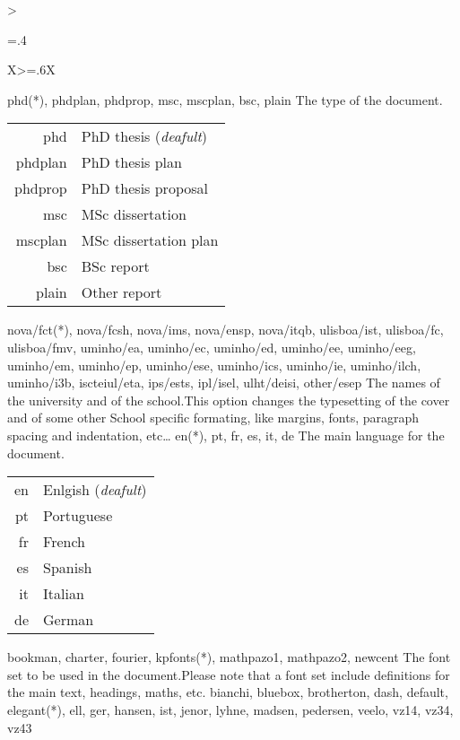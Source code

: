 \begin{xltabular}{\linewidth}{>{\hsize=.4\hsize\raggedright\arraybackslash}X>{\hsize=.6\hsize}X}
  \toprule
  {phd(*), phdplan, phdprop, msc, mscplan, bsc, plain}%
  {The type of the document.}{
    \begin{tabular}{r@{ $\rightarrow$ }X}
      phd     & PhD thesis (\emph{deafult}) \\
      phdplan & PhD thesis plan             \\
      phdprop & PhD thesis proposal         \\
      msc     & MSc dissertation            \\
      mscplan & MSc dissertation plan       \\
      bsc     & BSc report                  \\
      plain   & Other report                \\
    \end{tabular}
  }
  \midrule
  {nova/fct(*), nova/fcsh, nova/ims, nova/ensp, nova/itqb, ulisboa/ist, ulisboa/fc, ulisboa/fmv, uminho/ea, uminho/ec, uminho/ed, uminho/ee, uminho/eeg, uminho/em, uminho/ep, uminho/ese, uminho/ics, uminho/ie, uminho/ilch, uminho/i3b, iscteiul/eta, ips/ests, ipl/isel, ulht/deisi, other/esep}%
  {The names of the university and of the school.}{This option changes the typesetting of the cover and of some other School specific formating, like margins, fonts, paragraph spacing and indentation, etc…}
  \midrule
  {en(*), pt, fr, es, it, de}%
  {The main language for the document.}{
    \begin{tabular}{r@{ $\rightarrow$ }X}
      en & Enlgish (\emph{deafult}) \\
      pt & Portuguese               \\
      fr & French                   \\
      es & Spanish                  \\
      it & Italian                  \\
      de & German                   \\
    \end{tabular}
  }
  \midrule
  {bookman, charter, fourier, kpfonts(*), mathpazo1, mathpazo2, newcent}%
  {The font set to be used in the document.}{Please note that a font set include definitions for the main text, headings, maths, etc.}
  \midrule
  {bianchi, bluebox, brotherton, dash, default, elegant(*), ell, ger, hansen, ist, jenor, lyhne, madsen, pedersen, veelo, vz14, vz34, vz43}%

\end{xltabular}
